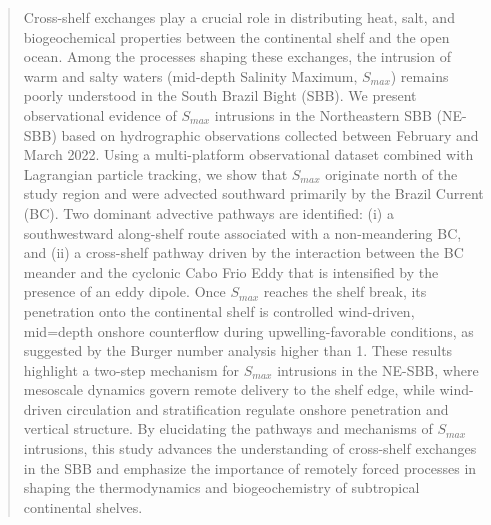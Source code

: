 \documentclass[draft]{agujournal2019}
\begin{document}
%
%

\begin{abstract}
Cross-shelf exchanges play a crucial role in distributing heat, salt, and biogeochemical properties between the continental shelf and the open ocean. Among the processes shaping these exchanges, the intrusion of warm and salty waters (mid-depth Salinity Maximum, \textit{$S_{max}$}) remains poorly understood in the South Brazil Bight (SBB). We present observational evidence of \textit{$S_{max}$} intrusions in the Northeastern SBB (NE-SBB) based on hydrographic observations collected between February and March 2022. Using a multi-platform observational dataset combined with Lagrangian particle tracking, we show that \textit{$S_{max}$} originate north of the study region and were advected southward primarily by the Brazil Current (BC). Two dominant advective pathways are identified: (i) a southwestward along-shelf route associated with a non-meandering BC, and (ii) a cross-shelf pathway driven by the interaction between the BC meander and the cyclonic Cabo Frio Eddy that is intensified by the presence of an eddy dipole. Once \textit{$S_{max}$} reaches the shelf break, its penetration onto the continental shelf is controlled wind-driven, mid=depth onshore counterflow during upwelling-favorable conditions, as suggested by the Burger number analysis higher than 1. These results highlight a two-step mechanism for \textit{$S_{max}$} intrusions in the NE-SBB, where mesoscale dynamics govern remote delivery to the shelf edge, while wind-driven circulation and stratification regulate onshore penetration and vertical structure. By elucidating the pathways and mechanisms of \textit{$S_{max}$} intrusions, this study advances the understanding of cross-shelf exchanges in the SBB and emphasize the importance of remotely forced processes in shaping the thermodynamics and biogeochemistry of subtropical continental shelves.
\end{abstract}
\end{document}
